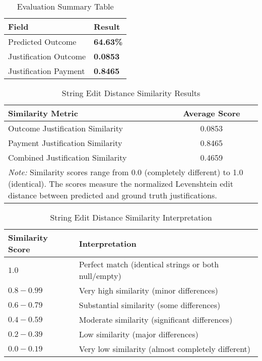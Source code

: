 
\begin{table}[H]
\centering
\caption{Evaluation Summary Table}
\label{tab:evaluation_summary}
\begin{tabular}{@{}lp{2cm}@{}}
\toprule
\textbf{Field} & \textbf{Result} \\
\midrule
Predicted Outcome & \textbf{64.63\%} \\
Justification Outcome &  \textbf{0.0853} \\
Justification Payment &  \textbf{0.8465} \\
\bottomrule
\end{tabular}
\end{table}

\begin{table}[!ht]
\centering
\caption{String Edit Distance Similarity Results}
\label{tab:string_edit_distance_results}
\begin{tabular}{lc}
\toprule
\textbf{Similarity Metric} & \textbf{Average Score} \\
\midrule
Outcome Justification Similarity & 0.0853 \\
Payment Justification Similarity & 0.8465 \\
Combined Justification Similarity & 0.4659 \\
\midrule
\multicolumn{2}{p{13cm}}{\textit{Note:} Similarity scores range from 0.0 (completely different) to 1.0 (identical). 
The scores measure the normalized Levenshtein edit distance between predicted and ground truth justifications.} \\
\bottomrule
\end{tabular}
\end{table}

\begin{table}[!ht]
\centering
\caption{String Edit Distance Similarity Interpretation}
\label{tab:string_edit_distance_interpretation}
\begin{tabular}{p{3cm}p{10cm}}
\toprule
\textbf{Similarity Score} & \textbf{Interpretation} \\
\midrule
$1.0$ & Perfect match (identical strings or both null/empty) \\
$0.8 - 0.99$ & Very high similarity (minor differences) \\
$0.6 - 0.79$ & Substantial similarity (some differences) \\
$0.4 - 0.59$ & Moderate similarity (significant differences) \\
$0.2 - 0.39$ & Low similarity (major differences) \\
$0.0 - 0.19$ & Very low similarity (almost completely different) \\
\bottomrule
\end{tabular}
\end{table}

